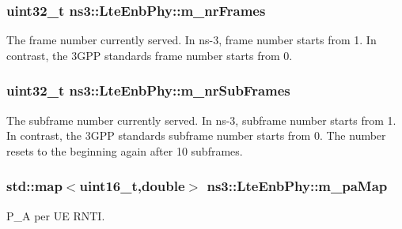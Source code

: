 \subsubsection[{\texorpdfstring{m\+\_\+nr\+Frames}{m_nrFrames}}]{\setlength{\rightskip}{0pt plus 5cm}uint32\+\_\+t ns3\+::\+Lte\+Enb\+Phy\+::m\+\_\+nr\+Frames\hspace{0.3cm}{\ttfamily [private]}}\hypertarget{classns3_1_1LteEnbPhy_ae8464d0dff85be592774739e81f28942}{}\label{classns3_1_1LteEnbPhy_ae8464d0dff85be592774739e81f28942}
The frame number currently served. In ns-\/3, frame number starts from 1. In contrast, the 3\+G\+PP standard\textquotesingle{}s frame number starts from 0. 
\subsubsection[{\texorpdfstring{m\+\_\+nr\+Sub\+Frames}{m_nrSubFrames}}]{\setlength{\rightskip}{0pt plus 5cm}uint32\+\_\+t ns3\+::\+Lte\+Enb\+Phy\+::m\+\_\+nr\+Sub\+Frames\hspace{0.3cm}{\ttfamily [private]}}\hypertarget{classns3_1_1LteEnbPhy_a21c4d540ccd4813df02001a5e0159a35}{}\label{classns3_1_1LteEnbPhy_a21c4d540ccd4813df02001a5e0159a35}
The subframe number currently served. In ns-\/3, subframe number starts from 1. In contrast, the 3\+G\+PP standard\textquotesingle{}s subframe number starts from 0. The number resets to the beginning again after 10 subframes. 
\subsubsection[{\texorpdfstring{m\+\_\+pa\+Map}{m_paMap}}]{\setlength{\rightskip}{0pt plus 5cm}std\+::map$<$uint16\+\_\+t,double$>$ ns3\+::\+Lte\+Enb\+Phy\+::m\+\_\+pa\+Map\hspace{0.3cm}{\ttfamily [private]}}\hypertarget{classns3_1_1LteEnbPhy_a9fa0dd1722f59badf99d2aa32a417fff}{}\label{classns3_1_1LteEnbPhy_a9fa0dd1722f59badf99d2aa32a417fff}


P\+\_\+A per UE R\+N\+TI. 

